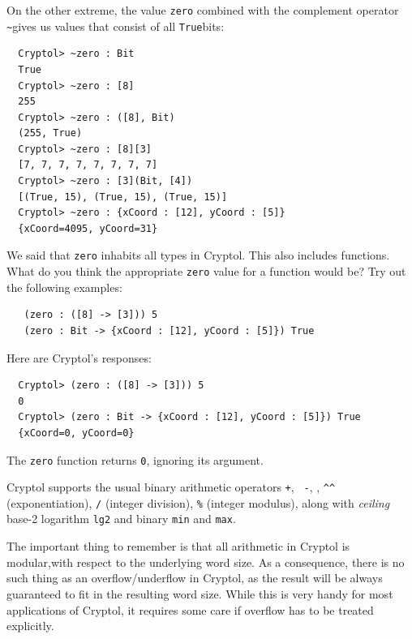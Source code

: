 \noindent On the other extreme, the value {\tt zero} combined with the
complement operator {\tt \Verb|~|}\indComplement gives us values that
consist of all {\tt True}\indTrue bits:
\begin{Verbatim}
  Cryptol> ~zero : Bit
  True
  Cryptol> ~zero : [8]
  255
  Cryptol> ~zero : ([8], Bit)
  (255, True)
  Cryptol> ~zero : [8][3]
  [7, 7, 7, 7, 7, 7, 7, 7]
  Cryptol> ~zero : [3](Bit, [4])
  [(True, 15), (True, 15), (True, 15)]
  Cryptol> ~zero : {xCoord : [12], yCoord : [5]}
  {xCoord=4095, yCoord=31}
\end{Verbatim}

\begin{Exercise}\label{ex:zero:0}
  We said that {\tt zero} inhabits all types in Cryptol. This also
  includes functions. What do you think the appropriate {\tt zero}
  value for a function would be?  Try out the following examples:
\begin{Verbatim}
   (zero : ([8] -> [3])) 5
   (zero : Bit -> {xCoord : [12], yCoord : [5]}) True
\end{Verbatim}
\end{Exercise}
\begin{Answer}
Here are Cryptol's responses:\indZero
\begin{Verbatim}
  Cryptol> (zero : ([8] -> [3])) 5
  0
  Cryptol> (zero : Bit -> {xCoord : [12], yCoord : [5]}) True
  {xCoord=0, yCoord=0}
\end{Verbatim}
The {\tt zero} function returns {\tt 0}, ignoring its argument.
\end{Answer}


Cryptol supports the usual binary arithmetic operators {\tt +}, {\tt
  -}, {\tt *}, {\tt \Verb|^^|} (exponentiation), {\tt /} (integer
division), {\tt \%} (integer modulus), along with \emph{ceiling}
base-2 logarithm {\tt lg2} and binary {\tt min} and {\tt max}.

The important thing to remember is that all arithmetic in Cryptol is
modular,\indModular with respect to the underlying word size.  As a
consequence, there is no such thing as an overflow/underflow in
Cryptol, as the result will be always guaranteed to fit in the
resulting word size.  While this is very handy for most applications of
Cryptol, it requires some care if overflow has to be treated
explicitly.\indOverflow\indUnderflow\indPlus\indMinus\indTimes\indDiv\indMod\indLg\indMin\indMax\indExponentiate

